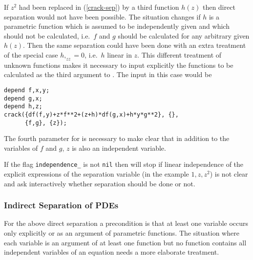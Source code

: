 If $z^2$ had been replaced in (\ref{crack-sep}) by a third function
$h(z)$ then direct separation would not have been possible.  The
situation changes if $h$ is a parametric function which is assumed to
be independently given and which should not be calculated, i.e.\ $f$
and $g$ should be calculated for any arbitrary given $h(z)$.  Then the
same separation could have been done with an extra treatment of the
special case $h,_{zz} = 0$, i.e.\ $h$ linear in $z$.  This different
treatment of unknown functions makes it necessary to input explicitly
the functions to be calculated as the third argument to
.  The input in this case would be
\begin{verbatim}
depend f,x,y;
depend g,x;
depend h,z;
crack({df(f,y)+z*f**2+(z+h)*df(g,x)+h*y*g**2}, {},
      {f,g}, {z});
\end{verbatim}
The fourth parameter for  is necessary to make clear
that in addition to the variables of $f$ and $g$, $z$ is also an
independent variable.

If the flag \texttt{independence\_} is not \texttt{nil} then
 will stop if linear independence of the explicit
expressions of the separation variable (in the example $1,z,z^2$) is
not clear and ask interactively whether separation should be done or
not.

\subsubsection{Indirect Separation of PDEs}

For the above direct separation a precondition is that at least one
variable occurs only explicitly or as an argument of parametric
functions.  The situation where each variable is an argument of at least
one function but no function contains all independent variables of an
equation needs a more elaborate treatment.

